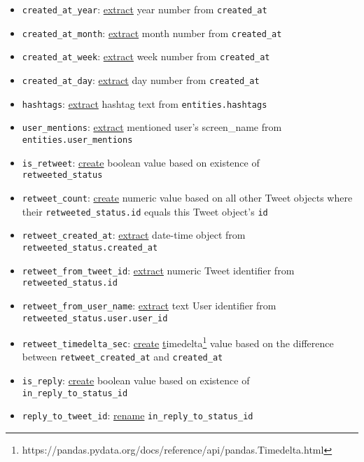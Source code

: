 \begin{itemize}
    \item \texttt{created\_at\_year}: \underline{extract} year number from \texttt{created\_at}
    \item \texttt{created\_at\_month}: \underline{extract} month number from \texttt{created\_at}
    \item \texttt{created\_at\_week}: \underline{extract} week number from \texttt{created\_at}
    \item \texttt{created\_at\_day}: \underline{extract} day number from \texttt{created\_at}
    \item \texttt{hashtags}: \underline{extract} hashtag text from \texttt{entities.hashtags}
    \item \texttt{user\_mentions}: \underline{extract} mentioned user's screen\_name from \\ 
    \texttt{entities.user\_mentions}
    \item \texttt{is\_retweet}: \underline{create} boolean value based on existence of \\
    \texttt{retweeted\_status}
    \item \texttt{retweet\_count}: \underline{create} numeric value based on all other Tweet objects where their \texttt{retweeted\_status.id} equals this Tweet object's \texttt{id}
    \item \texttt{retweet\_created\_at}: \underline{extract} date-time object from \\
    \texttt{retweeted\_status.created\_at}
    \item \texttt{retweet\_from\_tweet\_id}: \underline{extract} numeric Tweet identifier from \\
    \texttt{retweeted\_status.id}
    \item \texttt{retweet\_from\_user\_name}: \underline{extract} text User identifier from \\
    \texttt{retweeted\_status.user.user\_id}
    \item \texttt{retweet\_timedelta\_sec}: \underline{create} \href{https://pandas.pydata.org/docs/reference/api/pandas.Timedelta.html}timedelta\footnote{https://pandas.pydata.org/docs/reference/api/pandas.Timedelta.html} value based on the difference between \texttt{retweet\_created\_at} and \texttt{created\_at}
    \item \texttt{is\_reply}: \underline{create} boolean value based on existence of \\
    \texttt{in\_reply\_to\_status\_id}
    \item \texttt{reply\_to\_tweet\_id}: \underline{rename} \texttt{in\_reply\_to\_status\_id}

\end{itemize}
